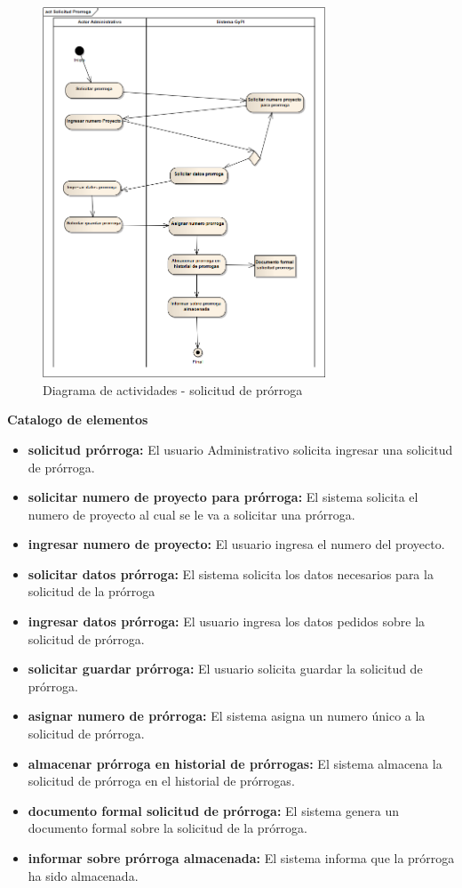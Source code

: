 \documentclass[12pt,oneside,letterpaper]{report}
\begin{document}
\begin{figure}[h!]
  \centering
    \includegraphics[width=0.75\textwidth]{./img/img13.png}
  \caption{Diagrama de actividades - solicitud de prórroga}
\end{figure}

\textbf{Catalogo de elementos}

\begin{itemize}
\item \textbf{solicitud prórroga:} El usuario Administrativo solicita ingresar una solicitud de prórroga.
\item \textbf{solicitar numero de proyecto para prórroga:} El sistema solicita el numero de proyecto al cual se le va a solicitar una prórroga.
\item \textbf{ingresar numero de proyecto:} El usuario ingresa el numero del proyecto.
\item \textbf{solicitar datos prórroga:} El sistema solicita los datos necesarios para la solicitud de la prórroga
\item \textbf{ingresar datos prórroga:} El usuario ingresa los datos pedidos sobre la solicitud de prórroga.
\item \textbf{solicitar guardar prórroga:} El usuario solicita guardar la solicitud de prórroga.
\item \textbf{asignar numero de prórroga:} El sistema asigna un numero único a la solicitud de prórroga.
\item \textbf{almacenar prórroga en historial de prórrogas:} El sistema almacena la solicitud de prórroga en el historial de prórrogas.
\item \textbf{documento formal solicitud de prórroga:} El sistema genera un documento formal sobre la solicitud de la prórroga.
\item \textbf{informar sobre prórroga almacenada:} El sistema informa que la prórroga ha sido almacenada.
\end{itemize}
\end{document}
